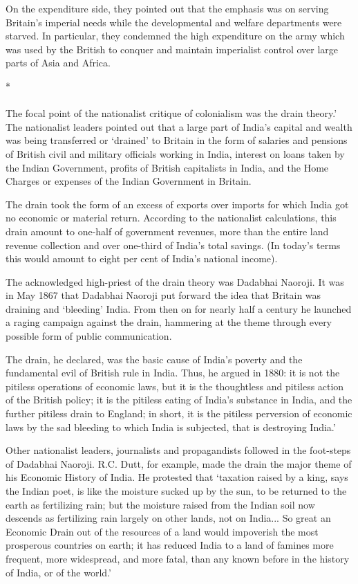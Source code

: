 On the expenditure side, they pointed out that the emphasis was on serving Britain's imperial needs while the developmental and welfare departments were starved. In particular, they condemned the high expenditure on the army which was used by the British to conquer and maintain imperialist control over large parts of Asia and Africa.

\begin{center}*\end{center}

\paragraph*{}


The focal point of the nationalist critique of colonialism was the drain theory.' The nationalist leaders pointed out that a large part of India's capital and wealth was being transferred or `drained' to Britain in the form of salaries and pensions of British civil and military officials working in India, interest on loans taken by the Indian Government, profits of British capitalists in India, and the Home Charges or expenses of the Indian Government in Britain.

The drain took the form of an excess of exports over imports for which India got no economic or material return. According to the nationalist calculations, this drain amount to one-half of government revenues, more than the entire land revenue collection and over one-third of India's total savings. (In today's terms this would amount to eight per cent of India's national income).

The acknowledged high-priest of the drain theory was Dadabhai Naoroji. It was in May 1867 that Dadabhai Naoroji put forward the idea that Britain was draining and `bleeding' India. From then on for nearly half a century he launched a raging campaign against the drain, hammering at the theme through every possible form of public communication.

The drain, he declared, was the basic cause of India's poverty and the fundamental evil of British rule in India. Thus, he argued in 1880: it is not the pitiless operations of economic laws, but it is the thoughtless and pitiless action of the British policy; it is the pitiless eating of India's substance in India, and the further pitiless drain to England; in short, it is the pitiless perversion of economic laws by the sad bleeding to which India is subjected, that is destroying India.'

Other nationalist leaders, journalists and propagandists followed in the foot-steps of Dadabhai Naoroji. R.C. Dutt, for example, made the drain the major theme of his Economic History of India. He protested that `taxation raised by a king, says the Indian poet, is like the moisture sucked up by the sun, to be returned to the earth as fertilizing rain; but the moisture raised from the Indian soil now descends as fertilizing rain largely on other lands, not on India... So great an Economic Drain out of the resources of a land would impoverish the most prosperous countries on earth; it has reduced India to a land of famines more frequent, more widespread, and more fatal, than any known before in the history of India, or of the world.'

